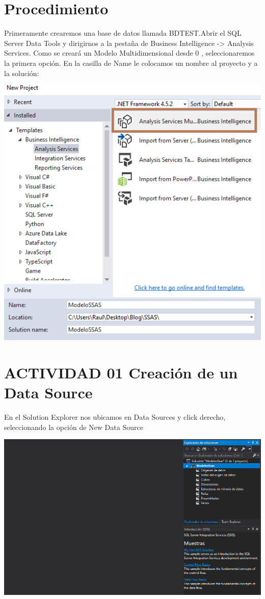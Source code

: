 \section{Procedimiento} 

Primeramente crearemos una base de datos llamada BDTEST.Abrir el SQL Server Data Tools y dirigirnos a la pestaña de Business Intelligence -> Analysis Services. Como se creará un Modelo Multidimensional desde 0 , seleccionaremos la primera opción. En la casilla de Name le colocamos un nombre al proyecto y a la solución:
	\begin{center}
	\includegraphics[width=\columnwidth]{images/task1/1}
	\end{center}	

\section{ACTIVIDAD 01 Creación de un Data Source}

En el Solution Explorer nos ubicamos en Data Sources y click derecho, seleccionando la opción de New Data Source
	\begin{center}
	\includegraphics[width=\columnwidth]{images/task1/2}
	\end{center}	

